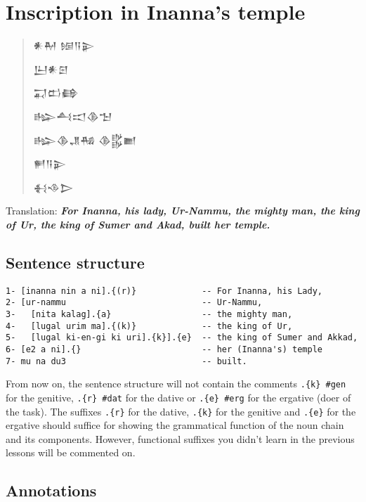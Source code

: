 \documentclass[a4paper,12pt]{book}
\newcommand{\fcn}{\setmainfont{Akkadian.otf}}
\begin{document}
\chapter{Inscription in Inanna's temple}

\begin{quotation}\LARGE\fcn
  𒀭𒈹 𒎏𒀀𒉌
  
  𒌨𒀭𒇉
  
  𒍑𒆗𒂵
  
  𒈗𒋀𒀊𒆠𒈠
  
  𒈗𒆠𒂗𒄀 𒆠𒌵𒆤
  
  𒂍𒀀𒉌
  
𒈬𒈾𒆕
\end{quotation}

Translation:
{\bf\em For Inanna, his lady, Ur-Nammu,
  the mighty man, the king of Ur,
  the king of Sumer and Akad, built her temple.}

\section{Sentence structure}
\begin{verbatim}
1- [inanna nin a ni].{(r)}             -- For Inanna, his Lady,
2- [ur-nammu                           -- Ur-Nammu,
3-   [nita kalag].{a}                  -- the mighty man,
4-   [lugal urim ma].{(k)}             -- the king of Ur,
5-   [lugal ki-en-gi ki uri].{k}].{e}  -- the king of Sumer and Akkad,
6- [e2 a ni].{}                        -- her (Inanna's) temple
7- mu na du3                           -- built.
\end{verbatim}

\newpage
From now on, the sentence structure
will not contain the comments \verb|.{k} #gen|
for the genitive, \verb|.{r} #dat| for the dative
or \verb|.{e} #erg| for the ergative (doer of the task).
The suffixes \verb|.{r}| for the dative,
\verb|.{k}| for the genitive
and \verb|.{e}| for the ergative
should suffice for showing the grammatical
function of the noun chain and its components.
However, functional suffixes you didn't learn
in the previous lessons will be commented on.

\section{Annotations}
\end{document}
